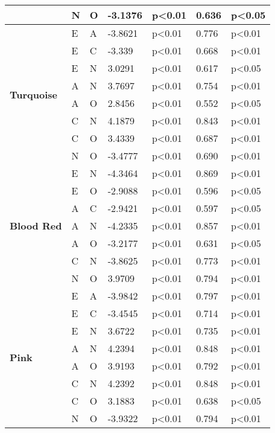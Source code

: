 \begin{longtable}{ |p{1.9cm}| p{0.5cm}|p{0.5cm}|p{1.2cm}| p{1.9cm}|p{1cm}|p{1.5cm}|  }
&N	&O	&-3.1376		&p<0.01	&0.636	&p<0.05\\
\hline 
\hline 
\multirow{8}{*}{\textbf{Turquoise}} 
&E			&A				&-3.8621			&p<0.01			&0.776		&p<0.01\\
&E			&C				&-3.339			&p<0.01			&0.668		&p<0.01\\
&E			&N				&3.0291			&p<0.01			&0.617		&p<0.05\\
&A			&N				&3.7697			&p<0.01			&0.754		&p<0.01\\
&A			&O				&2.8456			&p<0.01			&0.552		&p<0.05\\
&C			&N				&4.1879			&p<0.01			&0.843		&p<0.01\\
&C			&O				&3.4339			&p<0.01			&0.687		&p<0.01\\
&N			&O				&-3.4777			&p<0.01			&0.690 		&p<0.01\\
\hline 
\hline 
\multirow{7}{*}{\textbf{Blood Red}} 
&E			&N				&-4.3464			&p<0.01			&0.869		&p<0.01\\
&E			&O				&-2.9088			&p<0.01			&0.596		&p<0.05\\
&A			&C				&-2.9421			&p<0.01			&0.597		&p<0.05\\
&A			&N				&-4.2335			&p<0.01			&0.857		&p<0.01\\
&A			&O				&-3.2177			&p<0.01			&0.631		&p<0.05\\
&C			&N				&-3.8625			&p<0.01			&0.773		&p<0.01\\
&N			&O				&3.9709			&p<0.01			&0.794		&p<0.01\\
\hline 
\hline 
\multirow{8}{*}{\textbf{Pink}} 
&E			&A				&-3.9842			&p<0.01			&0.797		&p<0.01\\
&E			&C				&-3.4545			&p<0.01			&0.714		&p<0.01\\
&E			&N				&3.6722			&p<0.01			&0.735		&p<0.01\\
&A			&N				&4.2394			&p<0.01			&0.848		&p<0.01\\
&A			&O				&3.9193			&p<0.01			&0.792		&p<0.01\\
&C			&N				&4.2392			&p<0.01			&0.848		&p<0.01\\
&C			&O				&3.1883			&p<0.01			&0.638		&p<0.05\\
&N			&O				&-3.9322			&p<0.01			&0.794		&p<0.01\\
\hline 
\end{longtable}

